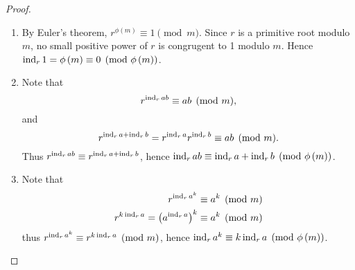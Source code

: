 \begin{proof}
    \begin{enumerate}
        \item By Euler's theorem, $r^{\phi\left(m\right)}\equiv 1 \pmod{m}$.
        Since $r$ is a primitive root modulo $m$, no small positive power of $r$ is
        congrugent to 1 modulo $m$.
        Hence $\operatorname{\mathrm{ind}}_r 1 = \phi\left(m\right) \equiv 0 \pmod{\phi\left(m\right)}$.
        \item Note that
        \[
            r^{\operatorname{\mathrm{ind}}_r ab} \equiv ab \pmod{m},
        \] and \[
            r^{\operatorname{\mathrm{ind}}_r a + \operatorname{\mathrm{ind}}_r b} = r^{\operatorname{\mathrm{ind}}_r a}r^{\operatorname{\mathrm{ind}}_r b} \equiv ab \pmod{m}.
        \]
        Thus $r^{\operatorname{\mathrm{ind}}_r ab} \equiv r^{\operatorname{\mathrm{ind}}_r a + \operatorname{\mathrm{ind}}_r b}$,
        hence $\operatorname{\mathrm{ind}}_r ab \equiv \operatorname{\mathrm{ind}}_r a + \operatorname{\mathrm{ind}}_r b \pmod{\phi\left(m\right)}$.
        \item Note that
        \begin{align*}
            r^{\operatorname{\mathrm{ind}}_r a^k} &\equiv a^k \pmod{m} \\
            r^{k \operatorname{\mathrm{ind}}_r a} = \left(a^{\operatorname{\mathrm{ind}}_r a}\right)^k &\equiv a^k \pmod{m}
        \end{align*}
        thus $r^{\operatorname{\mathrm{ind}}_r a^k} \equiv r^{k \operatorname{\mathrm{ind}}_r a} \pmod{m}$, hence
        $\operatorname{\mathrm{ind}}_r a^k \equiv k \operatorname{\mathrm{ind}}_r a \pmod{\phi\left(m\right)}$.
    \end{enumerate}
\end{proof}

